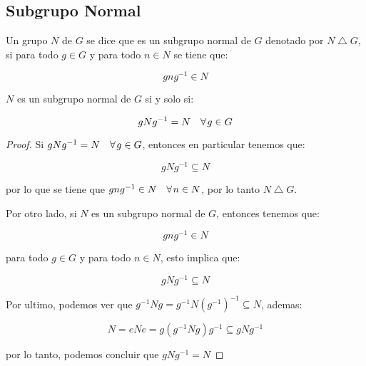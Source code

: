 
    \subsection{Subgrupo Normal}

        \begin{definicion}
            Un grupo $N$ de $G$ se dice que es un subgrupo normal de $G$ denotado por $N \bigtriangleup G$, si para todo $g \in G$ y para todo $n \in N$ se tiene que:

            \begin{equation}
                g n g^{-1} \in N
            \end{equation}
        \end{definicion}

        \begin{lema}
            $N$ es un subgrupo normal de $G$ si y solo si:

            \begin{equation}
                gNg^{-1} = N \quad \forall \mkern2mu g \in G
            \end{equation}
        \end{lema}

        \begin{proof}
            Si $gNg^{-1} = N \quad \forall \mkern2mu g \in G$, entonces en particular tenemos que:

            \begin{equation*}
                gNg^{-1} \subseteq N
            \end{equation*}

            por lo que se tiene que $gng^{-1} \in N \quad \forall \mkern2mu n \in N$, por lo tanto  $N \bigtriangleup G$.

            Por otro lado, si $N$ es un subgrupo normal de $G$, entonces tenemos que:

            \begin{equation*}
                gng^{-1} \in N
            \end{equation*}

            para todo $g \in G$ y para todo $n \in N$, esto implica que:

            \begin{equation*}
                gNg^{-1} \subseteq N
            \end{equation*}

            Por ultimo, podemos ver que $g^{-1} N g = g^{-1} N \left( g^{-1} \right)^{-1} \subseteq N$, ademas:

            \begin{equation*}
                N = e N e = g \left( g^{-1} N g \right) g^{-1} \subseteq g N g^{-1}
            \end{equation*}

            por lo tanto, podemos concluir que $gNg^{-1} = N$
        \end{proof}

